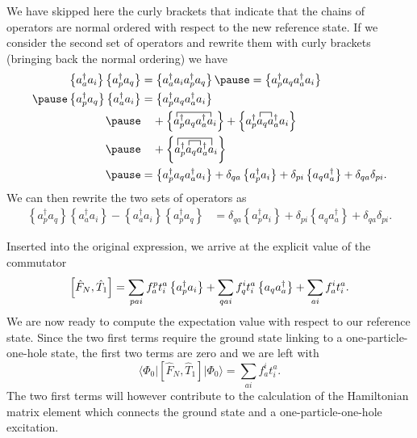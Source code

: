 We have skipped here the curly brackets that indicate that the chains of operators are normal ordered with respect to the new reference state. 
If we consider the second set of operators and rewrite them with curly brackets (bringing back the normal ordering) we have
        \begin{align*}
            \left\{a_a^\dagger a_i\right\} \left\{a_p^\dagger a_q \right\} &= \normord{a_a^\dagger a_i a_p^\dagger a_q} \pause
                = \normord{a_p^\dagger a_q a_a^\dagger a_i} \\ \pause
        \normord{a_p^\dagger a_q}\normord{a_a^\dagger a_i} &= \normord{a_p^\dagger a_q a_a^\dagger a_i}  \\ \pause
            & \quad + \normord{
               \contraction{}{a}{{}^\dagger_pa_q a^\dagger_a}{a}
                a^\dagger_p a_q a^\dagger_a a_i} +
            \normord{
                \contraction{a^\dagger_p}{a}{{}_q}{a}
                a^\dagger_p a_q a^\dagger_a a_i} \\ \pause
            & \quad + \normord{
                \contraction[1.5ex]{}{a}{{}^\dagger_pa_q a^\dagger_a}{a}
                \contraction{a^\dagger_p}{a}{{}_q}{a}
                a^\dagger_p a_q a^\dagger_a a_i} \\ \pause
            &=  \normord{a_p^\dagger a_q a_a^\dagger a_i} + \delta_{qa} \normord{a_p^\dagger a_i} + \delta_{pi} \normord{a_q a_a^\dagger}
            + \delta_{qa}\delta_{pi}.
        \end{align*}
We can then rewrite the two sets of operators as
        \begin{align*}
            \left\{a_p^\dagger a_q \right\}\left\{a_a^\dagger a_i\right\} - \left\{a_a^\dagger a_i\right\} \left\{a_p^\dagger a_q \right\} &= \delta_{qa} \left\{ a_p^\dagger a_i\right\} + \delta_{pi} \left\{ a_q a_a^\dagger \right\} + \delta_{qa}\delta_{pi}.
    \end{align*}

        Inserted into the original expression, we arrive at the explicit value of the commutator
        \[
        \left[ \hat{F}_N, \hat{T}_1 \right] = \sum_{pai} f_a^p t_i^a \left\{a_p^\dagger a_i\right\} + 
                \sum_{qai} f_q^i t_i^a \left\{a_q a_a^\dagger\right\} + \sum_{ai} f_a^i t_i^a.
        \]
We are now ready to compute the expectation value with respect to our reference state. Since the two first terms require the ground state linking to 
a one-particle-one-hole state, the first two terms are zero and we are left with 
\begin{equation}\label{eq:firsttermE}
\langle \Phi_0 \vert \left[ \hat{F}_N, \hat{T}_1 \right] \vert \Phi_0\rangle = \sum_{ai} f_a^i t_i^a.
\end{equation}
The two first terms will however contribute to the calculation of the Hamiltonian  matrix element which connects the ground state and a one-particle-one-hole excitation. 
  
